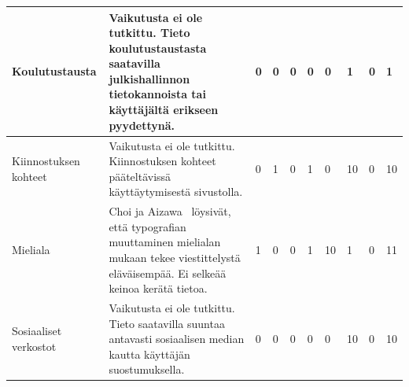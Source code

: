 \documentclass[finnish, 12pt, a4paper, elec, utf8, a-1b, online]{aaltothesis}
\begin{document}
{\begin{longtable}{p{2.5cm}|p{6cm}|p{0.5cm}p{0.5cm}p{0.5cm}|p{0.5cm}|p{0.5cm}p{0.5cm}p{0.5cm}|p{0.5cm}|}
    \midrule
    Koulutustausta                         & Vaikutusta ei ole tutkittu. Tieto koulutustaustasta saatavilla julkishallinnon tietokannoista tai käyttäjältä erikseen pyydettynä.                                                                                                                            & 0                                          & 0                                   & 0                                      & 0                            & 0                                               & 1                                         & 0                                         & 1                            \\
    \midrule
    Kiinnostuksen kohteet                  & Vaikutusta ei ole tutkittu. Kiinnostuksen kohteet pääteltävissä käyttäytymisestä sivustolla.                                                                                                                                                                  & 0                                          & 1                                   & 0                                      & 1                            & 0                                               & 10                                        & 0                                         & 10                           \\
    \midrule
    Mieliala                               & Choi ja Aizawa~\cite{choi_aizawa_2018} löysivät, että typografian muuttaminen mielialan mukaan tekee viestittelystä eläväisempää. Ei selkeää keinoa kerätä tietoa.                                                                                            & 1                                          & 0                                   & 0                                      & 1                            & 10                                              & 1                                         & 0                                         & 11                           \\
    \midrule
    Sosiaaliset verkostot                  & Vaikutusta ei ole tutkittu. Tieto saatavilla suuntaa antavasti sosiaalisen median kautta käyttäjän suostumuksella.                                                                                                                                            & 0                                          & 0                                   & 0                                      & 0                            & 0                                               & 10                                        & 0                                         & 10                           \\

\end{longtable}}
\end{document}
